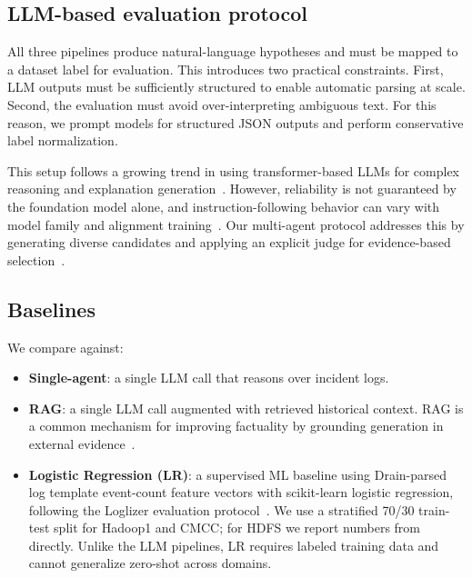 \subsection{LLM-based evaluation protocol}
All three pipelines produce natural-language hypotheses and must be mapped to a dataset label for
evaluation. This introduces two practical constraints. First, LLM outputs must be sufficiently
structured to enable automatic parsing at scale. Second, the evaluation must avoid
over-interpreting ambiguous text. For this reason, we prompt models for structured JSON outputs
and perform conservative label normalization.

This setup follows a growing trend in using transformer-based LLMs for complex reasoning and
explanation generation~\cite{vaswani2023attentionneed,brown2020languagemodelsfewshotlearners}.
However, reliability is not guaranteed by the foundation model alone, and instruction-following
behavior can vary with model family and alignment
training~\cite{ouyang2022traininglanguagemodelsfollow}. Our multi-agent protocol addresses this by
generating diverse candidates and applying an explicit judge for evidence-based
selection~\cite{du2023improvingfactualityreasoninglanguage,wu2023autogen}.

\subsection{Baselines}
We compare against:
\begin{itemize}
  \item \textbf{Single-agent}: a single LLM call that reasons over incident logs.
  \item \textbf{RAG}: a single LLM call augmented with retrieved historical context. RAG is a
        common mechanism for improving factuality by grounding generation in external
        evidence~\cite{lewis2021retrievalaugmentedgenerationknowledgeintensivenlp}.
  \item \textbf{Logistic Regression (LR)}: a supervised ML baseline using Drain-parsed log
        template event-count feature vectors with scikit-learn logistic regression, following
        the Loglizer evaluation
        protocol~\cite{he2016loglizer}. We use a stratified 70/30 train-test split for
        Hadoop1 and CMCC; for HDFS we report numbers from~\cite{he2016loglizer} directly.
        Unlike the LLM pipelines, LR requires labeled training data and cannot generalize
        zero-shot across domains.
\end{itemize}

